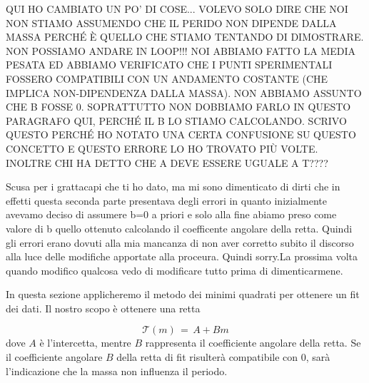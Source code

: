 QUI HO CAMBIATO UN PO' DI COSE... VOLEVO SOLO DIRE CHE NOI NON STIAMO ASSUMENDO CHE IL PERIDO 
NON DIPENDE DALLA MASSA PERCHÉ È QUELLO CHE STIAMO TENTANDO DI DIMOSTRARE. NON POSSIAMO ANDARE IN LOOP!!!
NOI ABBIAMO FATTO LA MEDIA PESATA ED ABBIAMO VERIFICATO CHE I PUNTI SPERIMENTALI FOSSERO
COMPATIBILI CON UN ANDAMENTO COSTANTE (CHE IMPLICA NON-DIPENDENZA DALLA MASSA). NON ABBIAMO ASSUNTO CHE
B FOSSE 0. SOPRATTUTTO NON DOBBIAMO FARLO IN QUESTO PARAGRAFO QUI, PERCHÉ IL B LO STIAMO CALCOLANDO.
SCRIVO QUESTO PERCHÉ HO NOTATO UNA CERTA CONFUSIONE SU QUESTO CONCETTO E QUESTO ERRORE LO HO TROVATO PIÙ VOLTE.
INOLTRE CHI HA DETTO CHE A DEVE ESSERE UGUALE A T????

Scusa per i grattacapi che ti ho dato, ma mi sono dimenticato di dirti che in effetti questa seconda parte presentava degli errori in quanto inizialmente avevamo deciso di assumere b=0 a priori e solo alla fine abiamo preso come valore di b quello ottenuto calcolando il coefficente angolare della retta. Quindi gli errori erano dovuti alla mia mancanza di non aver corretto subito il discorso alla luce delle modifiche apportate alla proceura. Quindi sorry.La prossima volta quando modifico qualcosa vedo di modificare tutto prima di dimenticarmene.

In questa sezione applicheremo il metodo dei minimi quadrati per ottenere un fit dei dati.
Il nostro scopo è ottenere una retta

\begin{equation}
	\mathcal{T}(m) \,=\, A + B m 
\end{equation}
%
dove $A$ è l'intercetta, mentre $B$ rappresenta il coefficiente angolare della retta. Se il coefficiente angolare $B$ della 
retta di fit risulterà compatibile con 0, sarà l'indicazione che la massa non influenza il periodo. 

